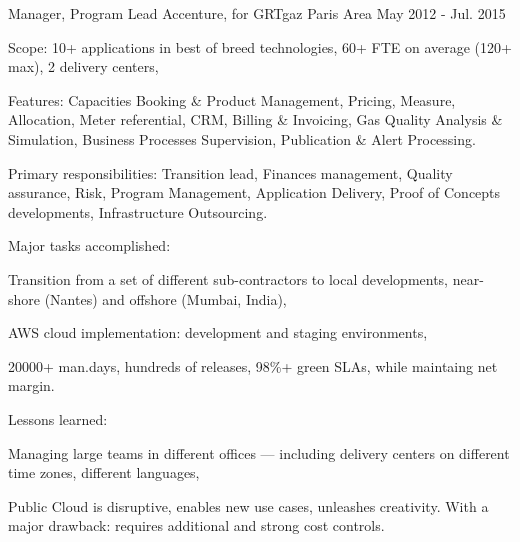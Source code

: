 \begin{cventries}
  \cventry
    {Manager, Program Lead} %
    {Accenture, for GRTgaz} %
    {Paris Area} %
    {May 2012 - Jul. 2015} %
    {
      \begin{cvitems} %
        \item {Scope: 10+ applications in best of breed technologies, 60+ FTE on average (120+ max), 2 delivery centers,}
        \item {Features: Capacities Booking \& Product Management, Pricing, Measure, Allocation, Meter referential, CRM, Billing \& Invoicing, Gas Quality Analysis \& Simulation, Business Processes Supervision, Publication \& Alert Processing.}
        \item {Primary responsibilities: Transition lead, Finances management, Quality assurance, Risk, Program Management, Application Delivery, Proof of Concepts developments, Infrastructure Outsourcing.}
        \item {Major tasks accomplished:}
        \begin{cvsubitems}
          \item {Transition from a set of different sub-contractors to local developments, near-shore (Nantes) and offshore (Mumbai, India),}
          \item {AWS cloud implementation: development and staging environments,}
          \item {20000+ man.days, hundreds of releases, 98\%+ green SLAs, while maintaing net margin.}
        \end{cvsubitems}
        \item {Lessons learned:}
        \begin{cvsubitems}
          \item {Managing large teams in different offices --- including delivery centers on different time zones, different languages,}
          \item {Public Cloud is disruptive, enables new use cases, unleashes creativity. With a major drawback: requires additional and strong cost controls.}
        \end{cvsubitems}
      \end{cvitems}
    }


\end{cventries}
